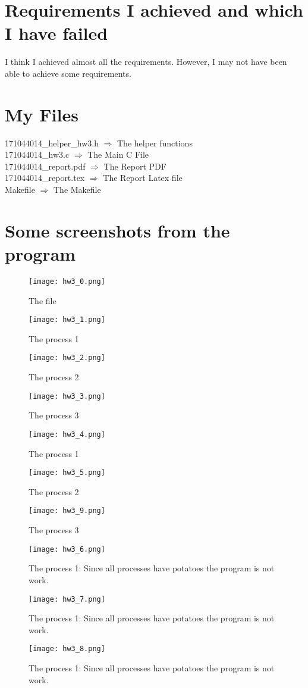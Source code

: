 \documentclass[20pt]{article}
\begin{document}
\section{Requirements I achieved and which I have failed}
I think I achieved almost all the requirements. However, I may not have been able to achieve some requirements.

\section{My Files}
171044014\_helper\_hw3.h $\Rightarrow$ The helper functions \\
171044014\_hw3.c $\Rightarrow$ The Main C File \\
171044014\_report.pdf $\Rightarrow$ The Report PDF \\
171044014\_report.tex $\Rightarrow$ The Report Latex file \\
Makefile $\Rightarrow$ The Makefile \\

\section{Some screenshots from the program}
\begin{figure}[h!]
  \texttt{[image: hw3\_0.png]}
  \caption{The file}
  \label{fig:code}
  \texttt{[image: hw3\_1.png]}
  \caption{The process 1}
  \label{fig:code}
  \texttt{[image: hw3\_2.png]}
  \caption{The process 2}
  \label{fig:code}
  \texttt{[image: hw3\_3.png]}
  \caption{The process 3}
  \label{fig:code}
\end{figure}

\begin{figure}[h!]
  \texttt{[image: hw3\_4.png]}
  \caption{The process 1}
  \label{fig:code}
  \texttt{[image: hw3\_5.png]}
  \caption{The process 2}
  \label{fig:code}
  \texttt{[image: hw3\_9.png]}
  \caption{The process 3}
  \label{fig:code}
\end{figure}

\begin{figure}[h!]
  \texttt{[image: hw3\_6.png]}
  \caption{The process 1: Since all processes have potatoes the program is not work.}
  \label{fig:code}
  \texttt{[image: hw3\_7.png]}
  \caption{The process 1: Since all processes have potatoes the program is not work.}
  \label{fig:code}
  \texttt{[image: hw3\_8.png]}
  \caption{The process 1: Since all processes have potatoes the program is not work.}
  \label{fig:code}
\end{figure}
\end{document}
